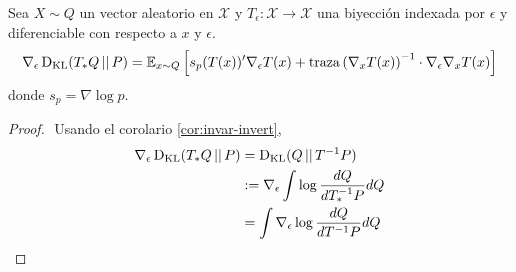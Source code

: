 \documentclass[main.tex]{subfiles}
\begin{document}
\begin{lemma}
    Sea $X\sim Q$ un vector aleatorio en $\mathcal{X}$ y $T_\epsilon:
    \mathcal{X} \to \mathcal{X}$ una biyección indexada por $\epsilon$ y
    diferenciable con respecto a $x$ y $\epsilon$.
    \begin{equation*}
        \nabla_\epsilon \operatorname*{D_{KL}}(T_*Q\operatorname*{\mid\mid} P)  = 
        \mathbb{E}_{x\sim Q}\left[
            s_p(T(x))'\nabla_\epsilon T(x) + 
            \mathrm{traza}\left(\nabla_xT(x)\right)^{-1}\cdot
            \nabla_\epsilon \nabla_x T(x)
        \right] 
    \end{equation*}
    donde $s_p = \nabla\log p$.
\end{lemma}
\begin{proof} $ $ \newline
    Usando el corolario \ref{cor:invar-invert}, 
    \begin{align*}
        \nabla_\epsilon\operatorname*{D_{KL}}(T_*Q\operatorname*{\mid\mid} P) &= \operatorname*{D_{KL}}(Q \operatorname*{\mid\mid} T^{-1}P) \\
        &:= \nabla_\epsilon\int\log\frac{dQ}{dT^{-1}_*P}dQ \\
        &= \int\nabla_\epsilon\log\frac{dQ}{dT^{-1}P}dQ
    \end{align*}

\end{proof}
\end{document}
